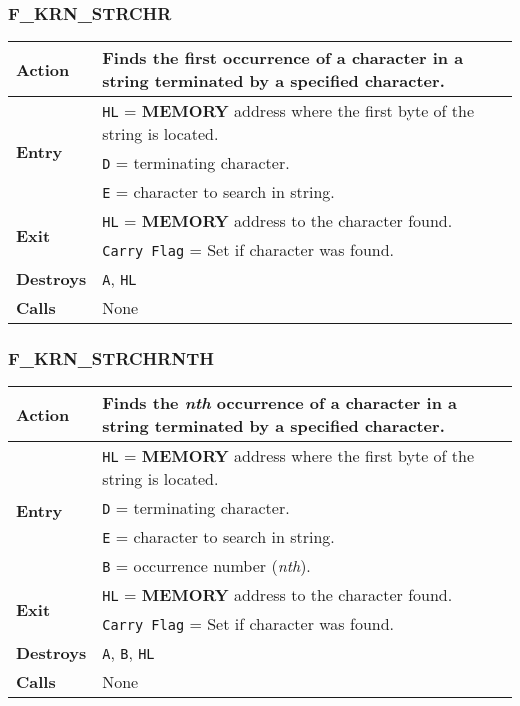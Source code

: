     \subsubsection{F\_KRN\_STRCHR}
    \label{func:fkrnstrchr}
    \begin{tabular}{l p{9cm}}
        \hline\textbf{Action}
        & Finds the first occurrence of a character in a string terminated by a
            specified character.\\
        \hline\multirow[t]{3}{4em}{\textbf{Entry}}
        & \texttt{HL} = \textbf{MEMORY} address where the first byte of the
        string is located.\\
        & \texttt{D} = terminating character.\\
        & \texttt{E} = character to search in string.\\
        \hline\multirow[t]{2}{4em}{\textbf{Exit}}
        & \texttt{HL} = \textbf{MEMORY} address to the character found.\\
        & \texttt{Carry Flag} = Set if character was found.\\
        \hline\textbf{Destroys} & \texttt{A}, \texttt{HL}\\
        \hline\textbf{Calls} & None\\
        \hline
    \end{tabular}

    \subsubsection{F\_KRN\_STRCHRNTH}
    \label{func:fkrnstrchr}
    \begin{tabular}{l p{9cm}}
        \hline\textbf{Action}
        & Finds the \textit{nth} occurrence of a character in a string terminated by a
            specified character.\\
        \hline\multirow[t]{4}{4em}{\textbf{Entry}}
        & \texttt{HL} = \textbf{MEMORY} address where the first byte of the
        string is located.\\
        & \texttt{D} = terminating character.\\
        & \texttt{E} = character to search in string.\\
        & \texttt{B} = occurrence number (\textit{nth}).\\
        \hline\multirow[t]{2}{4em}{\textbf{Exit}}
        & \texttt{HL} = \textbf{MEMORY} address to the character found.\\
        & \texttt{Carry Flag} = Set if character was found.\\
        \hline\textbf{Destroys} & \texttt{A}, \texttt{B}, \texttt{HL}\\
        \hline\textbf{Calls} & None\\
        \hline
    \end{tabular}